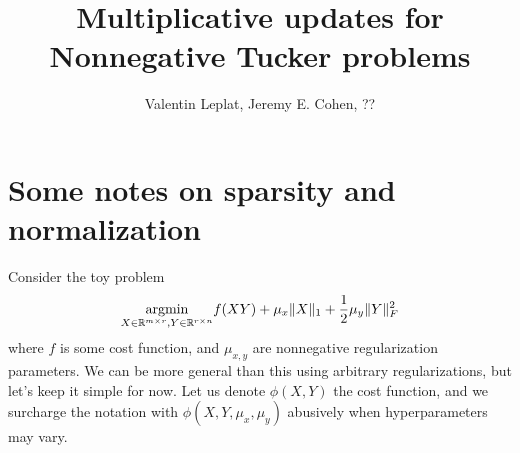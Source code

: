 \documentclass[a4paper, 11pt]{article}
\title{Multiplicative updates for Nonnegative Tucker problems}
\author{Valentin Leplat, Jeremy E. Cohen, ??}
\date{}
\begin{document}
\maketitle

\section{Some notes on sparsity and normalization}

Consider the toy problem
\begin{equation}\label{eq:toypb}
  \underset{X\in\mathbb{R}^{m\times r},Y\in\mathbb{R}^{r\times n}}{\mathop{\text{~argmin~}}}f(XY) + \mu_x \|X\|_1 + \frac{1}{2}\mu_y \|Y\|_F^2
\end{equation}
where \( f \) is some cost function, and \( \mu_{x,y} \) are nonnegative regularization parameters. We can be more general than this using arbitrary regularizations, but let's keep it simple for now. Let us denote \( \phi(X,Y) \) the cost function, and we surcharge the notation with \( \phi(X,Y,\mu_x,\mu_y) \) abusively when hyperparameters may vary.
\end{document}
